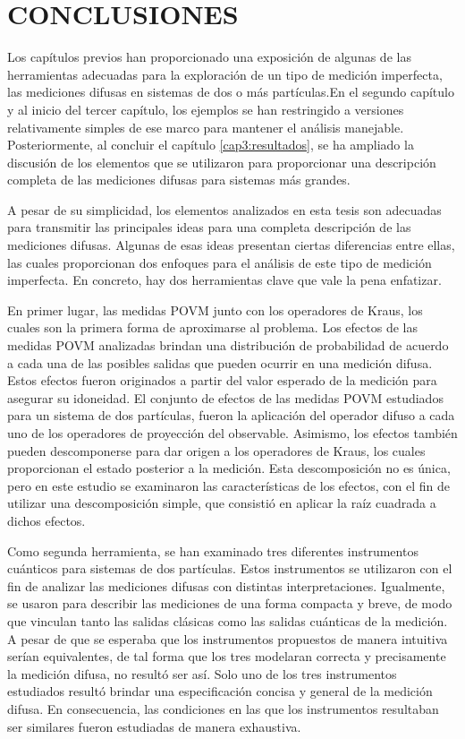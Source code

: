 \chapter{CONCLUSIONES}

Los capítulos previos han proporcionado una exposición de algunas de las herramientas adecuadas para la exploración de un tipo de medición imperfecta, las mediciones difusas en sistemas de dos o más partículas.En el segundo capítulo y al inicio del tercer capítulo, los ejemplos se han restringido a versiones relativamente simples de ese marco para mantener el análisis manejable. Posteriormente,  al concluir el capítulo {\ref{cap3:resultados}}, se ha ampliado la discusión de los elementos que se utilizaron para proporcionar una descripción completa de las mediciones difusas para sistemas más grandes.

A pesar de su simplicidad, los elementos analizados en esta tesis son adecuadas para transmitir las principales ideas para una completa descripción de las mediciones difusas. Algunas de esas ideas presentan ciertas diferencias entre ellas, las cuales proporcionan dos enfoques para el análisis de este tipo de medición imperfecta. En concreto, hay dos herramientas clave que vale la pena enfatizar. 

 En primer lugar, las medidas POVM junto con los operadores de Kraus, los cuales son la primera forma de aproximarse al problema. Los efectos de las medidas POVM  analizadas brindan una distribución de probabilidad de acuerdo a cada una de las posibles salidas que pueden ocurrir en una medición difusa. Estos efectos fueron originados a partir del valor esperado de la medición para asegurar su idoneidad. El conjunto de efectos de las medidas POVM estudiados para un sistema de dos partículas, fueron la aplicación del operador difuso a cada uno de los operadores de proyección del observable. Asimismo, los efectos también pueden descomponerse  para dar origen a los operadores de Kraus, los cuales proporcionan el estado posterior a la medición. Esta descomposición no es única, pero en este estudio se examinaron las características de los efectos, con el fin de utilizar una descomposición simple, que consistió en aplicar la raíz cuadrada a dichos efectos.

Como segunda herramienta, se han examinado tres diferentes instrumentos cuánticos para sistemas de dos partículas. Estos instrumentos se utilizaron con el fin de analizar las mediciones difusas con distintas interpretaciones. Igualmente, se usaron para describir las mediciones de una forma compacta y breve, de modo que vinculan tanto las salidas clásicas como las salidas cuánticas de la medición. A pesar de que se esperaba que los instrumentos propuestos de manera intuitiva serían equivalentes, de tal forma que los tres modelaran correcta y precisamente la medición difusa, no resultó ser así. Solo uno de los tres instrumentos estudiados resultó brindar una especificación concisa y general de la medición difusa. En consecuencia, las condiciones en las que los instrumentos resultaban ser similares fueron estudiadas de manera exhaustiva. 


